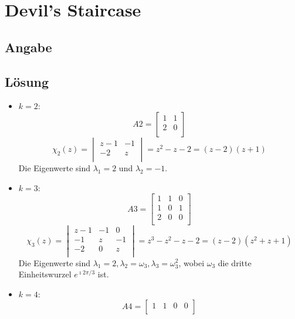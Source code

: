 \section*{Devil's Staircase}
\subsection*{Angabe}


\subsection*{Lösung}
\begin{flushenum}
\item
	\begin{itemize}
		\item $k= 2$: 
			\[ A2 = \begin{bmatrix}
					1 & 1 \\
					2 & 0 \\
				\end{bmatrix} \]
			\[ \chi_2(z) = 
				\begin{vmatrix}
					z - 1 & -1 \\
					-2    & z  \\
				\end{vmatrix} =
				z^2 - z - 2 = (z-2)(z+1) \]
			Die Eigenwerte sind $\lambda_1 = 2$ und $\lambda_2 = -1$.
		\item $k = 3$:
			\[ A3 = \begin{bmatrix}
					1 & 1 & 0 \\
					1 & 0 & 1 \\
					2 & 0 & 0 \\
				\end{bmatrix} \]
			\[ \chi_3(z) = 
				\begin{vmatrix}
					z-1 & -1 & 0 \\
					-1 & z & -1 \\
					-2 & 0 & z \\
				\end{vmatrix} =
				z^3 - z^2 - z - 2 = (z-2)(z^2 + z + 1) \]
			Die Eigenwerte sind $\lambda_1 = 2, \lambda_2 = \omega_3, \lambda_3 = \omega_3^2 $,
			wobei $\omega_3$ die dritte Einheitswurzel $e^{\imath 2 \pi / 3}$ ist.
		\item $k = 4$:
			\[ A4 =	\begin{bmatrix}
					1 & 1 & 0 & 0 \\

\end{bmatrix}\]
\end{itemize}
\end{flushenum}

